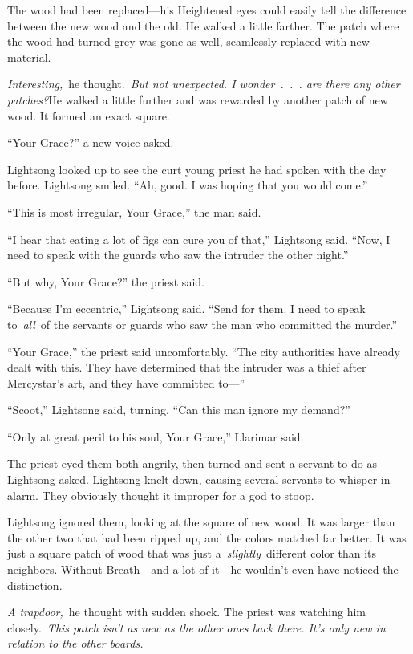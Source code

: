 The wood had been replaced—his Heightened eyes could easily tell the difference between the new wood and the old. He walked a little farther. The patch where the wood had turned grey was gone as well, seamlessly replaced with new material.

\textit{Interesting,}~he thought.~\textit{But not unexpected. I wonder~.~.~. are there any other patches?}He walked a little further and was rewarded by another patch of new wood. It formed an exact square.

“Your Grace?” a new voice asked.

Lightsong looked up to see the curt young priest he had spoken with the day before. Lightsong smiled. “Ah, good. I was hoping that you would come.”

“This is most irregular, Your Grace,” the man said.

“I hear that eating a lot of figs can cure you of that,” Lightsong said. “Now, I need to speak with the guards who saw the intruder the other night.”

“But why, Your Grace?” the priest said.

“Because I’m eccentric,” Lightsong said. “Send for them. I need to speak to~\textit{all}~of the servants or guards who saw the man who committed the murder.”

“Your Grace,” the priest said uncomfortably. “The city authorities have already dealt with this. They have determined that the intruder was a thief after Mercystar’s art, and they have committed to—”

“Scoot,” Lightsong said, turning. “Can this man ignore my demand?”

“Only at great peril to his soul, Your Grace,” Llarimar said.

The priest eyed them both angrily, then turned and sent a servant to do as Lightsong asked. Lightsong knelt down, causing several servants to whisper in alarm. They obviously thought it improper for a god to stoop.

Lightsong ignored them, looking at the square of new wood. It was larger than the other two that had been ripped up, and the colors matched far better. It was just a square patch of wood that was just a~\textit{slightly}~different color than its neighbors. Without Breath—and a lot of it—he wouldn’t even have noticed the distinction.

\textit{A trapdoor,}~he thought with sudden shock. The priest was watching him closely.~\textit{This patch isn’t as new as the other ones back there. It’s only new in relation to the other boards.}

